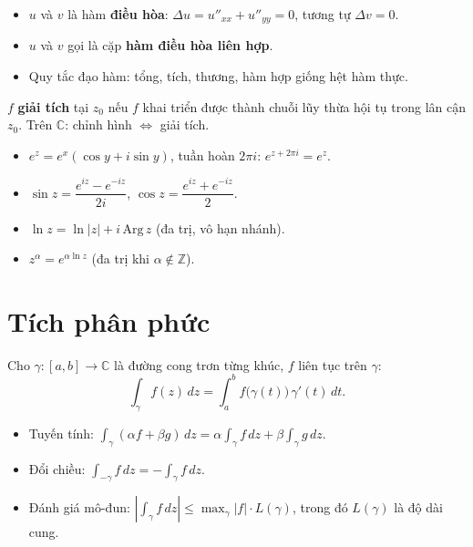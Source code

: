 \documentclass[12pt,a4paper]{article}
\begin{document}
\begin{tinhchat}
  \begin{itemize}
    \item $u$ và $v$ là hàm \textbf{điều hòa}: $\Delta u = u''_{xx} + u''_{yy} = 0$, tương tự $\Delta v = 0$.
    \item $u$ và $v$ gọi là cặp \textbf{hàm điều hòa liên hợp}.
    \item Quy tắc đạo hàm: tổng, tích, thương, hàm hợp giống hệt hàm thực.
  \end{itemize}
\end{tinhchat}

\begin{dinhnghia}[title={Hàm giải tích (analytic)}]
  $f$ \textbf{giải tích} tại $z_0$ nếu $f$ khai triển được thành chuỗi lũy thừa hội tụ trong lân cận $z_0$. Trên $\mathbb{C}$: chỉnh hình $\Leftrightarrow$ giải tích.
\end{dinhnghia}

\begin{congthuc}[title={Hàm sơ cấp phức}]
  \begin{itemize}
    \item $e^z = e^x(\cos y + i\sin y)$, tuần hoàn $2\pi i$: $e^{z + 2\pi i} = e^z$.
    \item $\sin z = \dfrac{e^{iz} - e^{-iz}}{2i}$, \quad $\cos z = \dfrac{e^{iz} + e^{-iz}}{2}$.
    \item $\ln z = \ln|z| + i\,\text{Arg}\,z$ (đa trị, vô hạn nhánh).
    \item $z^\alpha = e^{\alpha \ln z}$ (đa trị khi $\alpha \notin \mathbb{Z}$).
  \end{itemize}
\end{congthuc}

\section{Tích phân phức}

\begin{dinhnghia}
  Cho $\gamma: [a, b] \to \mathbb{C}$ là đường cong trơn từng khúc, $f$ liên tục trên $\gamma$:
  \[
    \int_\gamma f(z)\,dz = \int_a^b f\bigl(\gamma(t)\bigr)\,\gamma'(t)\,dt.
  \]
\end{dinhnghia}

\begin{tinhchat}
  \begin{itemize}
    \item Tuyến tính: $\int_\gamma (\alpha f + \beta g)\,dz = \alpha\int_\gamma f\,dz + \beta\int_\gamma g\,dz$.
    \item Đổi chiều: $\int_{-\gamma} f\,dz = -\int_\gamma f\,dz$.
    \item Đánh giá mô-đun: $\left|\int_\gamma f\,dz\right| \le \max_\gamma |f| \cdot L(\gamma)$, trong đó $L(\gamma)$ là độ dài cung.
  \end{itemize}
\end{tinhchat}
\end{document}
